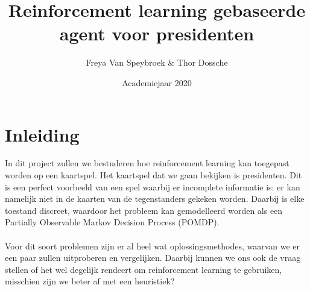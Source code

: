 \documentclass[11pt]{article}
\begin{document}
\begin{titlepage}
\title{Reinforcement learning gebaseerde agent voor presidenten}
\author{Freya Van Speybroek \& Thor Dossche}
\date{Academiejaar 2020 }
\maketitle
\thispagestyle{empty}
\end{titlepage}


\section{Inleiding}
In dit project zullen we bestuderen hoe reinforcement learning kan toegepast worden op een kaartspel. Het kaartspel dat we gaan bekijken is presidenten. Dit is een perfect voorbeeld van een spel waarbij er incomplete informatie is: er kan namelijk niet in de kaarten van de tegenstanders gekeken worden. Daarbij is elke toestand discreet, waardoor het probleem kan gemodelleerd worden als een Partially Observable Markov Decision Process (POMDP).\\\\
Voor dit soort problemen zijn er al heel wat oplossingsmethodes, waarvan we er een paar zullen uitproberen en vergelijken. Daarbij kunnen we ons ook de vraag stellen of het wel degelijk rendeert om reinforcement learning te gebruiken, misschien zijn we beter af met een heuristiek?
\end{document}
